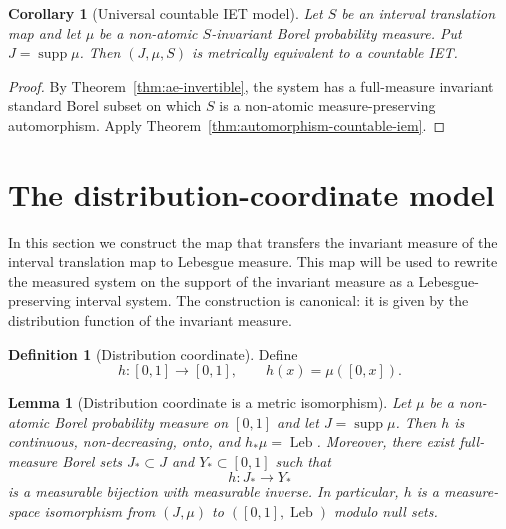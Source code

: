 \documentclass[11pt]{amsart}
\theoremstyle{plain}
\newtheorem{lemma}[theorem]{Lemma}
\newtheorem{corollary}[theorem]{Corollary}
\theoremstyle{definition}
\newtheorem{definition}[theorem]{Definition}
\theoremstyle{remark}
\DeclareMathOperator{\supp}{supp}
\DeclareMathOperator{\Leb}{Leb}
\begin{document}
\begin{corollary}[Universal countable IET model]
\label{cor:universal-countable-iem}
Let \(S\) be an interval translation map and let \(\mu\) be a non-atomic
\(S\)-invariant Borel probability measure. Put \(J=\supp\mu\). Then
\((J,\mu,S)\) is metrically equivalent to a countable IET.
\end{corollary}

\begin{proof}
By Theorem~\ref{thm:ae-invertible}, the system has a full-measure invariant standard Borel
subset on which \(S\) is a non-atomic measure-preserving automorphism. Apply
Theorem~\ref{thm:automorphism-countable-iem}.
\end{proof}

\section{The distribution-coordinate model}\label{sec:distribution-model}

In this section we construct the map that transfers the invariant measure of the
interval translation map to Lebesgue measure. This map will be used to rewrite the
measured system on the support of the invariant measure as a Lebesgue-preserving
interval system. The construction is canonical: it is given by the distribution
function of the invariant measure.


\begin{definition}[Distribution coordinate]
Define
\[
        h:[0,1]\to[0,1],\qquad h(x)=\mu([0,x]).
\]
\end{definition}

\begin{lemma}[Distribution coordinate is a metric isomorphism]\label{lem:h-isomorphism}
Let $\mu$ be a non-atomic Borel probability measure on $[0,1]$ and let $J=\supp\mu$. Then $h$ is continuous, non-decreasing, onto, and $h_*\mu=\Leb$. Moreover, there exist full-measure Borel sets $J_*\subset J$ and $Y_*\subset[0,1]$ such that
\[
        h:J_*\to Y_*
\]
is a measurable bijection with measurable inverse. In particular, $h$ is a measure-space isomorphism from $(J,\mu)$ to $([0,1],\Leb)$ modulo null sets.
\end{lemma}
\end{document}
